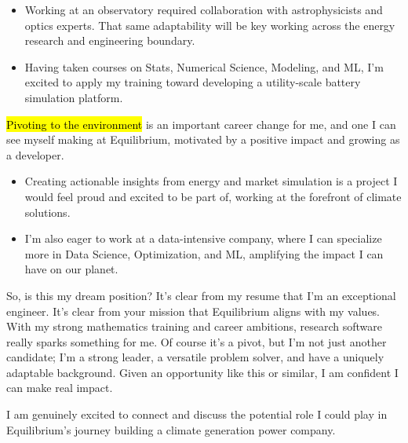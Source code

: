 \documentclass{tc_cv}
\begin{document}
\begin{adjustwidth}{38pt}{38pt}
\begin{itemize}
    \item Working at an observatory required collaboration with astrophysicists
      and optics experts. That same adaptability will be key working across
      the energy research and engineering boundary.

    \item Having taken courses on Stats, Numerical Science, Modeling, and ML,
      I'm excited to apply my training toward developing a utility-scale
      battery simulation platform.

  \end{itemize} \medbreak

  \hl{Pivoting to the environment} is an important career change for me, and
  one I can see myself making at Equilibrium, motivated by a positive impact
  and growing as a developer.
  \begin{itemize}

    \item Creating actionable insights from energy and market simulation is a
      project I would feel proud and excited to be part of, working at the
      forefront of climate solutions.

    \item I'm also eager to work at a data-intensive company, where I can
      specialize more in Data Science, Optimization, and ML, amplifying the
      impact I can have on our planet.

  \end{itemize} \medbreak

  So, is this my dream position? It's clear from my resume that I'm an
  exceptional engineer. It's clear from your mission that Equilibrium aligns
  with my values. With my strong mathematics training and career ambitions,
  research software really sparks something for me. Of course it's a pivot, but
  I'm not just another candidate; I'm a strong leader, a versatile problem
  solver, and have a uniquely adaptable background. Given an opportunity like
  this or similar, I am confident I can make real impact. \medbreak

  I am genuinely excited to connect and discuss the potential role I could play
  in Equilibrium's journey building a climate generation power company.


\end{adjustwidth}
\end{document}
